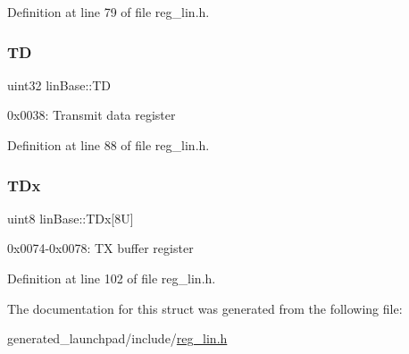 Definition at line 79 of file reg\+\_\+lin.\+h.

\mbox{\label{structlinBase_ae0f3e7ace2cb9e080aa482f907647e58}} 
\subsubsection{\texorpdfstring{TD}{TD}}
{\footnotesize\ttfamily uint32 lin\+Base\+::\+TD}

0x0038\+: Transmit data register 

Definition at line 88 of file reg\+\_\+lin.\+h.

\mbox{\label{structlinBase_a2c4ec84e80aabf2b48d6dda044d04a52}} 
\subsubsection{\texorpdfstring{T\+Dx}{TDx}}
{\footnotesize\ttfamily uint8 lin\+Base\+::\+T\+Dx\mbox{[}8\+U\mbox{]}}

0x0074-\/0x0078\+: TX buffer register 

Definition at line 102 of file reg\+\_\+lin.\+h.



The documentation for this struct was generated from the following file\+:\begin{DoxyCompactItemize}
\item 
generated\+\_\+launchpad/include/\mbox{\hyperlink{reg__lin_8h}{reg\+\_\+lin.\+h}}\end{DoxyCompactItemize}
